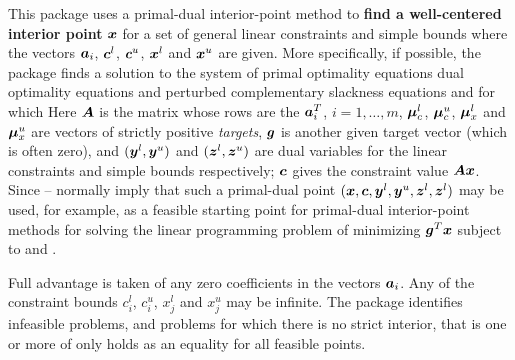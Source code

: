 \documentclass{galahad}
\begin{document}
\galheader


\galsummary
This package uses a primal-dual interior-point method
to {\bf find a well-centered interior point} ${\bm{x}}$ for a set of
general linear constraints
and simple bounds
where the vectors 
${\bm{a}}_{i}$, ${\bm{c}}^{l}$, ${\bm{c}}^{u}$, ${\bm{x}}^{l}$ and ${\bm{x}}^{u}$ are given.
More specifically, if possible, the package finds a solution to the 
system of  primal optimality equations
dual optimality equations
and perturbed complementary slackness equations
and
for which
Here ${\bm{A}}$ is the matrix whose rows are the ${\bm{a}}_i^T$, $i = 1, \ldots , m$,
$\bm \mu_c^{l}$, $\bm \mu_c^{u}$, $\bm \mu_x^{l}$ and $\bm \mu_x^{u}$ are
vectors of strictly positive {\em targets}, ${\bm{g}}$ is another given 
target vector (which is often zero),
and $({\bm{y}}^{l}, {\bm{y}}^{u})$ and $({\bm{z}}^{l}, {\bm{z}}^{u})$ are dual variables
for the linear constraints and simple bounds respectively; 
${\bm{c}}$ gives the constraint value ${\bm{A}} {\bm{x}}$.
Since -- normally imply that
such a primal-dual point $({\bm{x}}, {\bm{c}}, {\bm{y}}^{l}, {\bm{y}}^{u}, {\bm{z}}^{l}, {\bm{z}}^{l})$
may be used, for example, as a feasible starting point for primal-dual 
interior-point methods for solving the linear programming problem 
of minimizing ${\bm{g}}^T {\bm{x}}$ subject to  and .

Full advantage is taken of any zero coefficients in the 
vectors ${\bm{a}}_{i}$. 
Any of the constraint bounds $c_{i}^{l}$, $c_{i}^{u}$, 
$x_{j}^{l}$ and $x_{j}^{u}$ may be infinite.
The package identifies infeasible problems, and problems for which there
is no strict interior, that is one or more of 
only holds as an equality for all feasible points.
\end{document}
